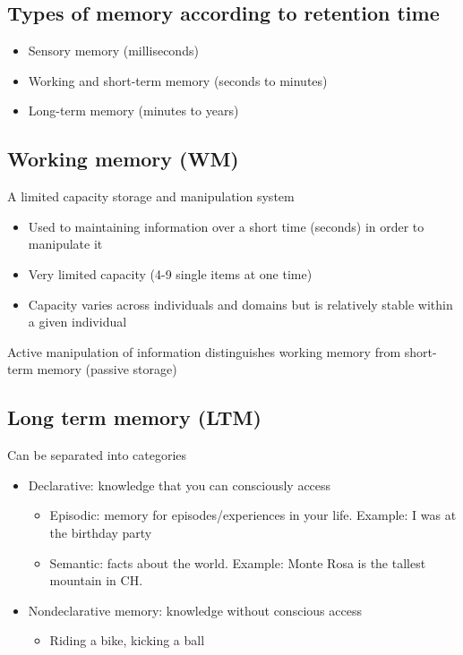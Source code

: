 \subsection{Types of memory according to retention time}
\begin{itemize}
    \item Sensory memory (milliseconds)
    \item Working and short-term memory (seconds to minutes)
    \item Long-term memory (minutes to years)
\end{itemize}
\subsection{Working memory (WM)}
A limited capacity storage and manipulation system 
\begin{itemize}
    \item Used to maintaining information over a short time (seconds) in order to manipulate it
    \item Very limited capacity (4-9 single items at one time)
    \item Capacity varies across individuals and domains but is relatively stable within a given individual
\end{itemize}
Active manipulation of information distinguishes working memory from short-term memory (passive storage)
\subsection{Long term memory (LTM)}
Can be separated into categories
\begin{itemize}
    \item Declarative: knowledge that you can consciously access
    \begin{itemize}
        \item Episodic: memory for episodes/experiences in your life. Example: I was at the birthday party
        \item Semantic: facts about the world. Example: Monte Rosa is the tallest mountain in CH.
    \end{itemize}
    \item Nondeclarative memory: knowledge without conscious access
    \begin{itemize}
        \item Riding a bike, kicking a ball
    \end{itemize}
\end{itemize}

